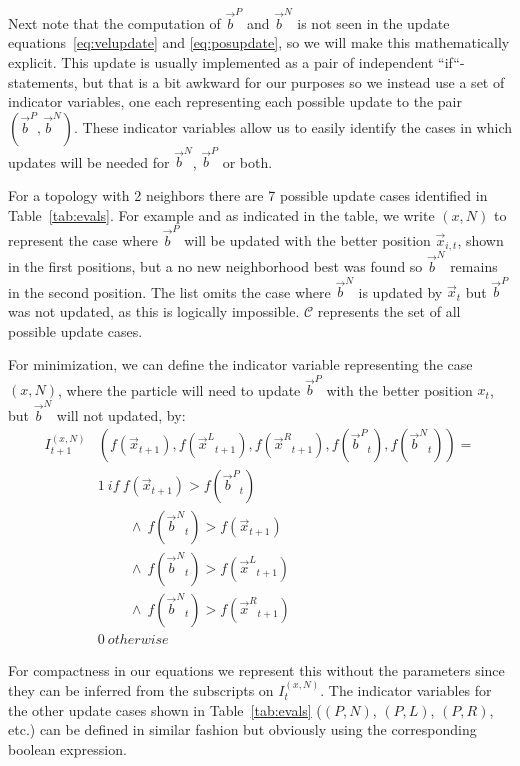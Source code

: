 \documentclass[journal,letterpaper]{IEEEtran}
\providecommand{\pers}{\ensuremath{P}}
\providecommand{\neigh}{\ensuremath{N}}
\providecommand{\leftind}{\ensuremath{L}}
\providecommand{\rightind}{\ensuremath{R}}
\providecommand{\ppos}{\ensuremath{\Vec{x}}}
\providecommand{\nbest}{\ensuremath{\Vec{b}^\neigh}}
\providecommand{\pbest}{\ensuremath{\Vec{b}^\pers}}
\providecommand{\ofunc}{\ensuremath{f}}
\providecommand{\indic}{\ensuremath{I}}
\providecommand{\leftn}{\ensuremath{\Vec{x}^\leftind}}
\providecommand{\rightn}{\ensuremath{\Vec{x}^\rightind}}
\providecommand{\caseset}{\ensuremath{\mathcal{C}}}
\providecommand{\casedef}{\ensuremath{(\pbest,\nbest)}}
\providecommand{\casexn}{\ensuremath{(x,\neigh)}}
\providecommand{\casepn}{\ensuremath{(\pers,\neigh)}}
\providecommand{\casepl}{\ensuremath{(\pers,\leftind)}}
\providecommand{\casepr}{\ensuremath{(\pers,\rightind)}}
\begin{document}
Next note that the computation of $\pbest$ and $\nbest$ is not seen in the
update equations~\eqref{eq:velupdate} and \eqref{eq:posupdate}, so we will make
this mathematically explicit.  This update is usually implemented as a pair of
independent ``if``-statements, but that is a bit awkward for our purposes
so we instead use a set of indicator variables, one each representing each
possible update to the pair $\casedef$.  These indicator variables allow
us to easily identify the cases in which updates will be needed for $\nbest$,
$\pbest$ or both.

For a topology with 2 neighbors there are 7 possible update cases identified in
Table~\ref{tab:evals}.
For example and as indicated in the table, we write $\casexn$ to represent the case where $\pbest$ will be
updated with the better position $\ppos_{i,t}$, shown in the first positions,
but a no new neighborhood best was found so $\nbest$ remains in the second
position.
The list omits the case where $\nbest$ is updated by
$\ppos_{t}$ but $\pbest$ was not updated, as this is logically impossible.
$\caseset$ represents the set of all possible update cases.

For minimization, we can define the indicator variable representing the case $\casexn$,
where the particle will need to update $\pbest$ with the better
position $x_{t}$, but $\nbest$ will not updated, by:
\begin{align}
\nonumber
	\indic_{t+1}^{\casexn} & (\ofunc ( \ppos_{t+1} ) ,\ofunc(\leftn_{t+1}),\ofunc(\rightn_{t+1}) ,\ofunc(\pbest_{t}) ,\ofunc(\nbest_{t}))= \\
\nonumber
	& 1 \ if \  \ofunc(\ppos_{t+1}) > \ofunc(\pbest_{t}) \\
\nonumber
	& \quad \quad \ \wedge \ \ofunc(\nbest_{t}) > \ofunc(\ppos_{t+1}) \\
\nonumber
	& \quad \quad \ \wedge \ \ofunc(\nbest_{t}) > \ofunc(\leftn_{t+1}) \\
\nonumber
	& \quad \quad \ \wedge \ \ofunc(\nbest_{t}) > \ofunc(\rightn_{t+1}) \\
\label{eq:deficasexn}
	& 0 \ otherwise
\end{align}

For compactness in our equations we represent this without the parameters since
they can be inferred from the subscripts on $\indic_{t}^{\casexn}$.  The
indicator variables for the other update cases shown in Table~\ref{tab:evals}
($\casepn$, $\casepl$, $\casepr$, etc.) can be defined in similar fashion but
obviously using the corresponding boolean expression.
\end{document}
